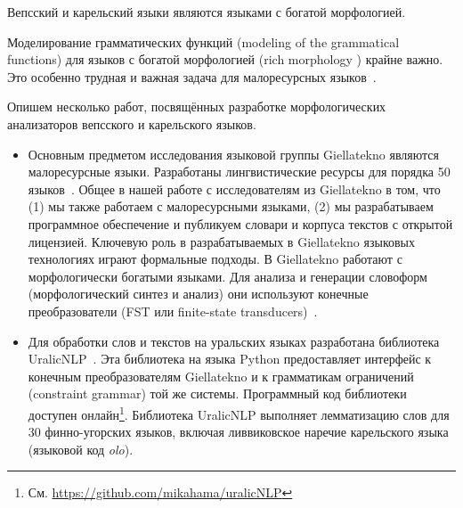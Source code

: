 Вепсский и карельский языки являются языками с богатой морфологией.

Моделирование грамматических функций (modeling of the grammatical functions)
для языков с богатой морфологией (rich morphology
) крайне важно.
Это особенно трудная и важная задача
для малоресурсных языков~\cite[2820]{Cruz-Anastasopoulos-Stump2020Chatino}.


Опишем несколько работ, посвящённых разработке морфологических анализаторов вепсского и карельского языков.
\begin{itemize}
  \item Основным предметом исследования языковой группы Giellatekno 
      являются малоресурсные языки.  
        Разработаны лингвистические ресурсы 
        для порядка 50 языков~\cite{Moshagen2014}. 
        Общее в нашей работе с исследователям из Giellatekno в том, что 
        (1) мы также работаем с малоресурсными языками, 
        (2) мы разрабатываем программное обеспечение 
        и публикуем словари и корпуса текстов с открытой лицензией.
      Ключевую роль в разрабатываемых в Giellatekno языковых технологиях 
        играют формальные подходы. 
        В Giellatekno работают с морфологически богатыми языками.
        Для анализа и генерации словоформ (морфологический синтез и анализ) 
        они используют конечные преобразователи 
        (FST или finite-state transducers)~\cite{Moshagen2014}. 
% 
  \item Для обработки слов и текстов на уральских языках разработана 
      библиотека UralicNLP~\cite{UralicNLP2019Hamalainen}. 
        Эта библиотека на языка Python предоставляет интерфейс 
        к конечным преобразователям Giellatekno 
        и к грамматикам ограничений (constraint grammar) той же системы. 
        Программный код библиотеки доступен 
        онлайн\footnote{См. \url{https://github.com/mikahama/uralicNLP}}.
        Библиотека UralicNLP выполняет лемматизацию слов 
        для 30 финно-угорских языков, включая 
        ливвиковское наречие карельского языка (языковой код \textit{olo}).
\end{itemize}
